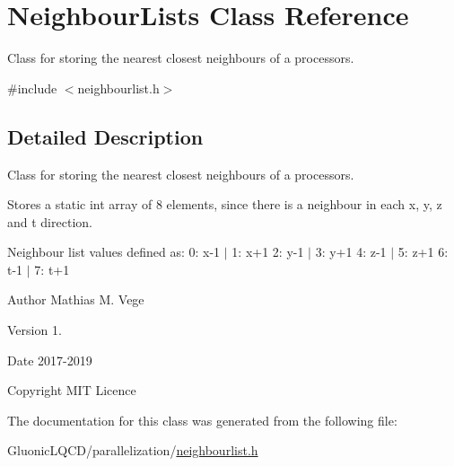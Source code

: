 \hypertarget{class_neighbour_lists}{}\section{Neighbour\+Lists Class Reference}
\label{class_neighbour_lists}


Class for storing the nearest closest neighbours of a processors.  




{\ttfamily \#include $<$neighbourlist.\+h$>$}



\subsection{Detailed Description}
Class for storing the nearest closest neighbours of a processors. 

Stores a static int array of 8 elements, since there is a neighbour in each x, y, z and t direction.

Neighbour list values defined as\+: 0\+: x-\/1 $\vert$ 1\+: x+1 2\+: y-\/1 $\vert$ 3\+: y+1 4\+: z-\/1 $\vert$ 5\+: z+1 6\+: t-\/1 $\vert$ 7\+: t+1

\begin{DoxyAuthor}{Author}
Mathias M. Vege 
\end{DoxyAuthor}
\begin{DoxyVersion}{Version}
1. 
\end{DoxyVersion}
\begin{DoxyDate}{Date}
2017-\/2019 
\end{DoxyDate}
\begin{DoxyCopyright}{Copyright}
M\+IT Licence 
\end{DoxyCopyright}


The documentation for this class was generated from the following file\+:\begin{DoxyCompactItemize}
\item 
Gluonic\+L\+Q\+C\+D/parallelization/\mbox{\hyperlink{neighbourlist_8h}{neighbourlist.\+h}}\end{DoxyCompactItemize}
